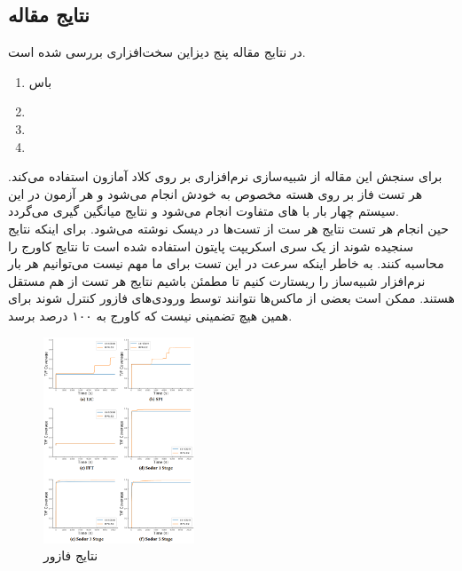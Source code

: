\documentclass[conference]{IEEEtran}
\begin{document}
\subsection{نتایج مقاله
}
در نتایج مقاله
پنج دیزاین سخت‌افزاری بررسی شده است.
\begin{enumerate}
    \item باس
    \item {}
    \item {}
    \item {}
\end{enumerate}
برای سنجش این مقاله از
شبیه‌سازی نرم‌افزاری بر روی کلاد آمازون استفاده می‌کند.
هر تست فاز بر روی هسته مخصوص به خودش انجام می‌شود و هر آزمون در این
سیستم چهار بار با
های متفاوت انجام می‌شود و نتایج میانگین گیری می‌گردد. \\
حین‌ انجام هر تست نتایج هر ست از تست‌ها در دیسک نوشته می‌شود.
برای اینکه نتایج سنجیده شوند از یک سری اسکریپت پایتون استفاده شده است تا
نتایج کاورج را محاسبه کنند.
به خاطر اینکه سرعت در این تست برای ما مهم نیست می‌توانیم هر بار
نرم‌افزار شبیه‌ساز را ریستارت کنیم تا مطمئن باشیم نتایج هر تست
از هم مستقل هستند.
ممکن است بعضی از ماکس‌ها نتوانند توسط ورودی‌های فازور کنترل شوند
برای همین هیچ تضمینی نیست که کاورج به ۱۰۰ درصد برسد.
\begin{figure}[!t]
    \centering
    \includegraphics[width=0.4\textwidth]{res4.png}
    \caption{
        نتایج فازور
    }
    \label{fig5}
\end{figure}
\end{document}
